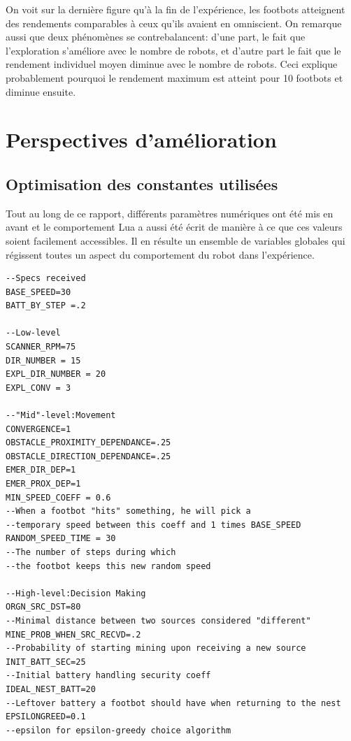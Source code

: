 On voit sur la dernière figure qu'à la fin de l'expérience, les footbots atteignent des rendements comparables à ceux qu'ils avaient en omniscient. On remarque aussi que deux phénomènes se contrebalancent: d'une part, le fait que l'exploration s'améliore avec le nombre de robots, et d'autre part le fait que le rendement individuel moyen diminue avec le nombre de robots. Ceci explique probablement pourquoi le rendement maximum est atteint pour 10 footbots et diminue ensuite.





\FloatBarrier
\section{Perspectives d'amélioration}

\subsection{Optimisation des constantes utilisées}
Tout au long de ce rapport, différents paramètres numériques ont été mis en avant et le comportement Lua a aussi été écrit de manière à ce que ces valeurs soient facilement accessibles. Il en résulte un ensemble de variables globales qui régissent toutes un aspect du comportement du robot dans l'expérience.

\begin{lstlisting}[caption=Définitions des variables globales]
--Specs received
BASE_SPEED=30
BATT_BY_STEP =.2

--Low-level
SCANNER_RPM=75
DIR_NUMBER = 15
EXPL_DIR_NUMBER = 20
EXPL_CONV = 3

--"Mid"-level:Movement
CONVERGENCE=1
OBSTACLE_PROXIMITY_DEPENDANCE=.25
OBSTACLE_DIRECTION_DEPENDANCE=.25
EMER_DIR_DEP=1
EMER_PROX_DEP=1
MIN_SPEED_COEFF = 0.6
--When a footbot "hits" something, he will pick a
--temporary speed between this coeff and 1 times BASE_SPEED
RANDOM_SPEED_TIME = 30
--The number of steps during which
--the footbot keeps this new random speed

--High-level:Decision Making
ORGN_SRC_DST=80
--Minimal distance between two sources considered "different"
MINE_PROB_WHEN_SRC_RECVD=.2
--Probability of starting mining upon receiving a new source
INIT_BATT_SEC=25
--Initial battery handling security coeff
IDEAL_NEST_BATT=20
--Leftover battery a footbot should have when returning to the nest
EPSILONGREED=0.1
--epsilon for epsilon-greedy choice algorithm
\end{lstlisting}

